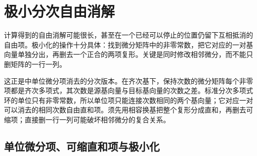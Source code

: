 
\section{极小分次自由消解}
\label{b3:sec:2105}


%
%
%

计算得到的自由消解可能很长，甚至在一个已经可以停止的位置仍留下互相抵消的自由项。极小化的操作十分具体：找到微分矩阵中的非零常数，把它对应的一对基向量单独分出，再删去一个正合的两项复形。关键是同时修改相邻微分，而不能只删矩阵的一行一列。

\ProseParagraphBreak

这正是中单位微分项消去的分次版本。在齐次基下，保持次数的微分矩阵每个非零项都是齐次多项式，其次数是源基向量与目标基向量的次数之差。标准分次多项式环的单位只有非零常数，所以单位项只能连接次数相同的两个基向量；它对应一对可以消去的相同次数自由直和项。须先用相容换基把整个复形分成直和，再删去可缩项；直接删一行一列可能破坏相邻微分的复合关系。

\subsection{单位微分项、可缩直和项与极小化}
\label{b3:subsec:2105:01}

